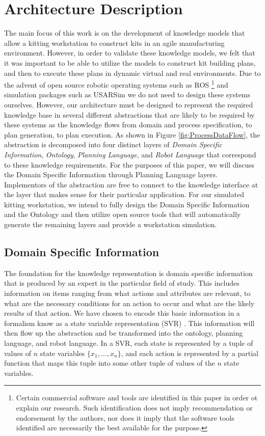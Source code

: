 \documentclass[a4paper, 10pt, conference]{ieeeconf}      %
\begin{document}
\section{Architecture Description}
\label{sect:Architecture}
The main focus of this work is on the development of knowledge models that allow a kitting workstation to construct kits
in an agile manufacturing environment. However, in order to validate these knowledge models, we felt that it was
important to be able to utilize the models to construct kit building plans, and then to execute these plans in dynamic
virtual and real environments. Due to the advent of open source robotic operating systems such as ROS \cite{ROS}
 \footnote{Certain commercial software and tools are identified in this paper in order ot explain our research. Such identification does not imply
recommendation or endorsement by the authors, nor does it imply that the software tools identified are necessarily the best available for the purpose.}
 and simulation
packages such as USARSim \cite{Balakirsky2007} we do not need to design these systems ourselves. However, our architecture must
be designed to represent the required knowledge base in several different abstractions that are likely to be
required by these systems as the knowledge flows from domain and process specification, to plan generation, to plan execution.
As shown in Figure \ref{fig:ProcessDataFlow}, the abstraction is decomposed into four
distinct layers of {\it Domain Specific Information}, {\it Ontology}, {\it Planning Language}, and {\it Robot Language} that correspond to these
knowledge requirements. For the purposes of this paper, we will discuss the Domain Specific Information through Planning Language layers. Implementors of the abstraction are free to connect to the knowledge interface at the layer that makes sense for
their particular application. For our simulated kitting workstation, we intend to fully design the Domain Specific Information and the Ontology and
then utilize open
source tools that will automatically generate the remaining layers and provide a workstation simulation.

\subsection{Domain Specific Information}
\label{subsect:DomainSpecific}
The foundation for the knowledge representation is domain specific information that is produced by an expert in the particular field of study. This includes
information on items ranging from what actions and attributes are relevant, to what are the necessary conditions for an action to occur and what are the
likely results of that action. We have chosen to encode this basic information in a formalism know as a state variable representation (SVR) \cite{NAU.2004}.
This information will then flow up the abstraction and be transformed into the ontology, planning language, and robot language.
In a SVR, each state is represented by a tuple of values of $n$ state variables $\lbrace x_1,\dots,x_n\rbrace$, and each action is represented by a partial function that maps this tuple into some other tuple of values of the $n$ state variables. 
\end{document}
